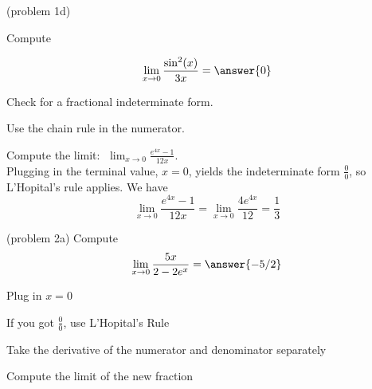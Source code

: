 \documentclass[handout]{ximera}
\begin{document}
\begin{problem}(problem 1d)

Compute

        \[  \lim_{x \to 0} \frac{\sin^2(x)}{3x} = \answer{0} \]
  
   \begin{hint}   Check for a fractional indeterminate form.  \end{hint}
    
   \begin{hint}   Use the chain rule in the numerator.        \end{hint}
		
\end{problem}



\begin{example}[example 2]
 Compute the limit:  $\displaystyle{\;\lim_{x \to 0} \frac{e^{4x} - 1}{12x}}.$\\
Plugging in the terminal value, $x=0$, yields 
the indeterminate form $\frac00$, so L'Hopital's rule applies.
We have 
\[
\lim_{x \to 0} \frac{e^{4x} - 1}{12x} = \lim_{x \to 0} \frac{4e^{4x}}{12} = \frac13
\]
\end{example}


\begin{problem}(problem 2a)
  Compute
  \[
  \lim_{x \to 0} \frac{5x}{2 - 2e^x} = \answer{-5/2}
  \]
  
    \begin{hint}
      Plug in $x=0$
    \end{hint}
    \begin{hint}
      If you got $\frac00$, use L'Hopital's Rule
    \end{hint}
    \begin{hint}
      Take the derivative of the numerator and denominator separately
    \end{hint}
	  \begin{hint}
      Compute the limit of the new fraction
    \end{hint}
	
\end{problem}
\end{document}
